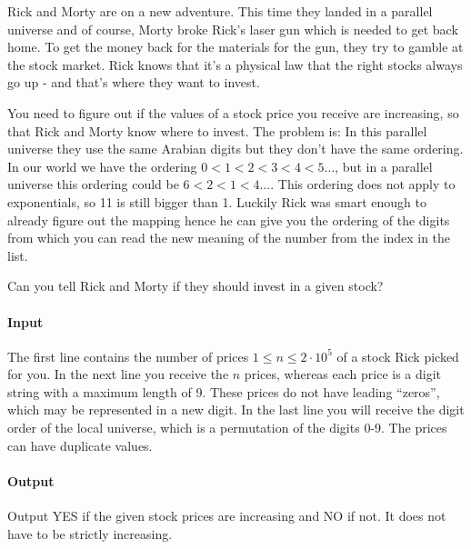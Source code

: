 



\makeheader

Rick and Morty are on a new adventure. This time they landed in a parallel universe and of course, Morty broke Rick's laser gun which is needed to get back home. To get the money back for the materials for the gun, they try to gamble at the stock market. Rick knows that it's a physical law that the right stocks always go up - and that's where they want to invest.

You need to figure out if the values of a stock price you receive are increasing, so that Rick and Morty know where to invest. The problem is: In this parallel universe they use the same Arabian digits but they don't have the same ordering. In our world we have the ordering $0 < 1 < 2 < 3 < 4 < 5 \dots$, but in a parallel universe this ordering could be $6 < 2 < 1 < 4 \dots$. This ordering does not apply to exponentials, so 11 is still bigger than 1. Luckily Rick was smart enough to already figure out the mapping hence he can give you the ordering of the digits from which you can read the new meaning of the number from the index in the list.

Can you tell Rick and Morty if they should invest in a given stock?

\paragraph*{Input}

The first line contains the number of prices $1\leq n\leq 2\cdot 10^5$ of a stock Rick picked for you. In the next line you receive the $n$ prices, whereas each price is a digit string with a maximum length of 9. These prices do not have leading ``zeros'', which may be represented in a new digit. In the last line you will receive the digit order of the local universe, which is a permutation of the digits 0-9. The prices can have duplicate values.

\paragraph*{Output}

Output YES if the given stock prices are increasing and NO if not. It does not have to be strictly increasing.

\begin{samples}
\end{samples}


